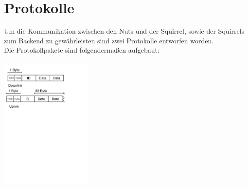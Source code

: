 \documentclass[12pt,a4paper]{article}
\begin{document}
\section{Protokolle}
Um die Kommunikation zwischen den Nuts und der Squirrel, sowie der Squirrels zum Backend zu gewährleisten sind zwei Protokolle entworfen worden.\\
Die Protokollpakete sind folgendermaßen aufgebaut:
\\
\\
\includegraphics[height=6.5cm]{./ProkollDiagrams.pdf}\\
\end{document}
